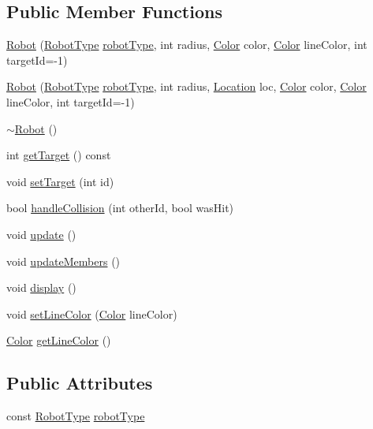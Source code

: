 \subsection*{Public Member Functions}
\begin{DoxyCompactItemize}
\item 
\hyperlink{classRobot_a2ddd4ae79de00f20b5ceb2df49f7d05e}{Robot} (\hyperlink{Robot_8h_a78d284d08fd22d809fd436256f2cbc39}{Robot\-Type} \hyperlink{classRobot_a49eb06af6d6981c941a24edc54210316}{robot\-Type}, int radius, \hyperlink{structColor}{Color} color, \hyperlink{structColor}{Color} line\-Color, int target\-Id=-\/1)
\item 
\hyperlink{classRobot_a3fa5c6664ffed53633e6e90fd398c287}{Robot} (\hyperlink{Robot_8h_a78d284d08fd22d809fd436256f2cbc39}{Robot\-Type} \hyperlink{classRobot_a49eb06af6d6981c941a24edc54210316}{robot\-Type}, int radius, \hyperlink{structLocation}{Location} loc, \hyperlink{structColor}{Color} color, \hyperlink{structColor}{Color} line\-Color, int target\-Id=-\/1)
\item 
\hyperlink{classRobot_a924320124b09c2f2ac1621aa210d5f38}{$\sim$\-Robot} ()
\item 
int \hyperlink{classRobot_a23f5bb01abf88e4c0edd370949080a4c}{get\-Target} () const 
\item 
void \hyperlink{classRobot_aa1b41b16fe5609310c4b7d23a4553970}{set\-Target} (int id)
\item 
bool \hyperlink{classRobot_a94d8b5083b9426e3769a5f84f310093e}{handle\-Collision} (int other\-Id, bool was\-Hit)
\item 
void \hyperlink{classRobot_adc34eec22821c2dce23904a5ea75cf13}{update} ()
\item 
void \hyperlink{classRobot_a6f8e6aaedcb7c130d37b5e653faea070}{update\-Members} ()
\item 
void \hyperlink{classRobot_a079c44b63ede22b1b6be4297934886da}{display} ()
\item 
void \hyperlink{classRobot_a9a44e2faef3d3927473ac0bacad8b670}{set\-Line\-Color} (\hyperlink{structColor}{Color} line\-Color)
\item 
\hyperlink{structColor}{Color} \hyperlink{classRobot_adf3e43c63f0173fe05cc35ef8d607aca}{get\-Line\-Color} ()
\end{DoxyCompactItemize}
\subsection*{Public Attributes}
\begin{DoxyCompactItemize}
\item 
const \hyperlink{Robot_8h_a78d284d08fd22d809fd436256f2cbc39}{Robot\-Type} \hyperlink{classRobot_a49eb06af6d6981c941a24edc54210316}{robot\-Type}
\end{DoxyCompactItemize}
